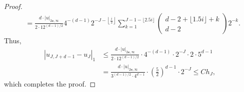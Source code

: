 \begin{proof}
\begin{equation*}
\begin{aligned}
&=\frac{d \cdot|u|_{2\mathbf{e},\infty}}{2 \cdot 12^{(d-1) / 2}} 4^{-(d-1)} 2^{-J-\left\lfloor\frac{i}{2}\right\rfloor} \sum_{k=1}^{J-1-\lfloor 2.5 i\rfloor}\left(\begin{array}{c}
d-2+\lfloor 1.5 i\rfloor+k \\
d-2
\end{array}\right) 2^{-k} .
\end{aligned}
\end{equation*}
Thus,
\begin{equation*}
\begin{aligned}
\left|u_{J,J+d-1}-u_J\right|_1
&\leq \frac{d \cdot|u|_{2\mathbf{e},\infty}}{2 \cdot 12^{(d-1) / 2}}  \cdot 4^{-(d-1)} \cdot 2^{-J} \cdot 2 \cdot 5^{d-1}\\
&=\frac{d \cdot|u|_{2\mathbf{e},\infty}}{3^{(d-1) / 2} \cdot 4^{d-1}} \cdot\left(\frac{5}{2}\right)^{d-1} \cdot 2^{-J}\le Ch_J,
\end{aligned}
\end{equation*}
which completes the proof.




\end{proof}
